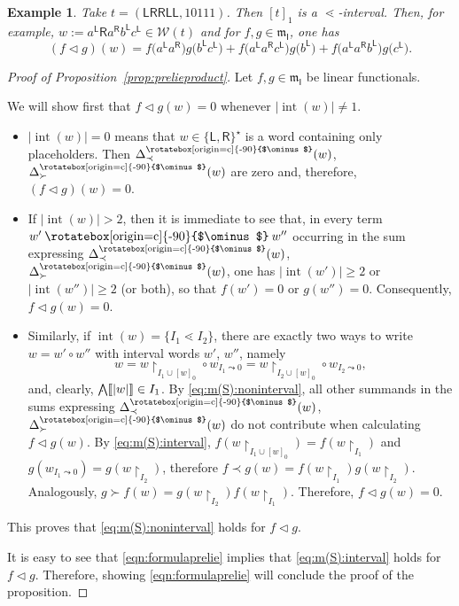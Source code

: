\documentclass[pdftex]{sigma}
\newcommand\overt{\mathbin{\text{\rotatebox[origin=c]{-90}{$\ominus$}}}}
\newcommand\INT[1]{\operatorname{int}(#1)}
\newcommand{\interval}[1]{\llbracket #1 \rrbracket}
\renewcommand{\restriction}[2]{{#1\mathbin{\upharpoonright}_{#2}}}
\newcommand{\translucidation}[2]{{{#1}_{#2\leadsto0}}}
\newcommand{\stdl}{\lessdot}
\newcommand{\bigwedgedot}{{\mathop{\bigwedge\hspace{-7.8pt}\raisebox{-1pt}[0pt][0pt]{$\cdot$}\hspace{3pt}}\nolimits}}
\newcommand\IWc{\mathcal{W}}
\newcommand{\vcp}{\Delta^{\overt}}
\newcommand\vcpSpr{\vcp_{\prec}}
\newcommand\vcpSsu{\vcp_{\succ}}
\newcommand\LL{{\mathsf{L}}}
\newcommand\RR{{\mathsf{R}}}
\newcommand\shalI{{\mathfrak m}_{\mathsf I}}
\numberwithin{equation}{section}
\newtheorem{Example}[Theorem]{Example}
\begin{document}
\begin{Example}
	Take $t = (\LL\RR\RR\LL\LL, 10111)$.
	Then $[t]_1$ is a $\stdl$-interval.
	Then, for example, $w := a^{\LL}\RR a^{\RR} b^{\LL} c^{\LL} \in \IWc(t)$
	and for $f,g \in \shalI$, one has
	\begin{equation*}
		(f \vartriangleleft g)(w)
		=
		f\big(a^{\LL} a^{\RR}\big)g\big(b^{\LL} c^{\LL}\big)
		+ f\big(a^{\LL}a^{\RR}c^{\LL}\big)g\big(b^{\LL}\big)
		+ f\big(a^{\LL}a^{\RR}b^{\LL}\big)g\big(c^{\LL}\big).
	\end{equation*}
\end{Example}
\begin{proof}[Proof of Proposition~\ref{prop:prelieproduct}]
	Let $f,g \in \shalI$ be linear functionals.

 We will show first that $f\vartriangleleft g(w)=0$ whenever $|\INT{w}|\neq 1$.
 \begin{itemize}\itemsep=0pt
 \item
 $|\INT{w}|=0$ means that $w\in\{\LL,\RR\}^{\star}$ is a word containing only placeholders. Then $\vcpSpr(w)$, $\vcpSsu(w)$ are zero and, therefore, $(f\vartriangleleft g)(w)=0$.
 \item
 If $|\INT{w}|>2$, then it is immediate to see that, in every term $w^{\prime}\overt w^{\prime\prime}$ occurring in the sum expressing $\vcpSpr(w)$, $\vcpSsu(w)$, one has $|\INT{w'}|\geq2$ or $|\INT{w''}|\geq2$ (or both), so that $f(w')=0$ or $g(w'')=0$. Consequently, $f\vartriangleleft g(w)=0$.
 \item
 Similarly, if $\INT{w}=\{I_1\stdl I_2\}$, there are exactly two ways to write $w=w'\circ w''$ with interval words $w'$, $w''$, namely
 \[w=\restriction{w}{I_1\cup [w]_0}\circ \translucidation{w}{I_1}=\restriction{w}{I_2\cup [w]_0}\circ \translucidation{w}{I_2},\]
 and, clearly,
 $\bigwedgedot\interval{|w|}\in I_1$.
 By \eqref{eq:m(S):noninterval}, all other summands in the sums expressing $\vcpSpr(w)$, $\vcpSsu(w)$ do not contribute when calculating $f\vartriangleleft g(w)$.
 By \eqref{eq:m(S):interval}, $f(\restriction{w}{I_1\cup [w]_0})=f(\restriction{w}{I_1})$ and $g(\translucidation{w}{I_1})=g(\restriction{w}{I_2})$,
 therefore $f\prec g(w)=f(\restriction{w}{I_1})g(\restriction{w}{I_2})$.
 Analogously, $g\succ f(w)=g(\restriction{w}{I_2})f(\restriction{w}{I_1})$. Therefore, $f\vartriangleleft g(w)=0$.
 \end{itemize}
 This proves that \eqref{eq:m(S):noninterval} holds for $f\vartriangleleft g$.

 It is easy to see that \eqref{eqn:formulaprelie} implies that \eqref{eq:m(S):interval} holds for $f\vartriangleleft g$. Therefore, showing \eqref{eqn:formulaprelie} will conclude the proof of the proposition.


\end{proof}
\end{document}
